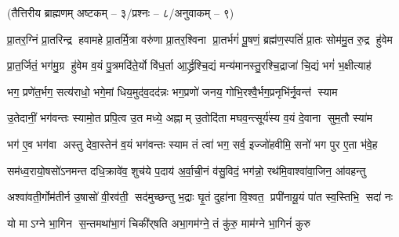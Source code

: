 

\centerline{\normalsize(तैत्तिरीय ब्राह्मणम् अष्टकम् – ३/प्रश्नः – ८/अनुवाकम् – ९)}


\twolineshloka
{प्रा॒तर॒ग्निं प्रा॒तरिन्द्र हवामहे प्रा॒तर्मि॒त्रा वरु॑णा प्रा॒तर॒श्विना}
{प्रा॒तर्भगं॑ पू॒षणं॒ ब्रह्म॑ण॒स्पतिं॑ प्रा॒तः सोम॑मु॒त रु॒द्र हु॑वेम}

\twolineshloka
{प्रा॒त॒र्जितं॒ भग॑मु॒ग्र हु॑वेम व॒यं पु॒त्रमदि॑ते॒र्यो वि॑ध॒र्ता}
{आ॒र्द्ध्रश्चि॒द्यं मन्य॑मानस्तु॒रश्चि॒द्राजा॑ चि॒द्यं भगं॑ भ॒क्षीत्याह॑}

\twolineshloka
{भग॒ प्रणे॑त॒र्भग॒ सत्य॑राधो॒ भगे॒मां धिय॒मुद॑व॒दद॑न्नः}
{भग॒प्रणो॑ जनय॒ गोभि॒रश्वै॒र्भग॒प्रनृभि॑र्नृ॒वन्त॑ स्याम}

\twolineshloka
{उ॒तेदानीं॒ भग॑वन्तः स्यामो॒त प्रपि॒त्व उ॒त मध्ये॒ अह्नाम्}
{उ॒तोदि॑ता मघव॒न्त्सूर्य॑स्य व॒यं दे॒वाना सुम॒तौ स्या॑म}

\twolineshloka
{भग॑ ए॒व भग॑वा अस्तु देवा॒स्तेन॑ व॒यं भग॑वन्तः स्याम}
{तं त्वा॑ भग॒ सर्व॒ इज्जो॑हवीमि॒ सनो॑ भग पुर ए॒ता भ॑वे॒ह}

\twolineshloka
{सम॑ध्व॒रायो॒षसो॑ऽनमन्त दधि॒क्रावे॑व॒ शुच॑ये प॒दाय॑}
{अ॒र्वा॒ची॒नं व॑सु॒विदं॒ भग॑न्नो॒ रथ॑मि॒वाश्वा॑वा॒जिन॒ आ॑वहन्तु}

\twolineshloka
{अश्वा॑वती॒र्गोम॑तीर्न उ॒षासो॑ वी॒रव॑ती॒ सद॑मुच्छन्तु भ॒द्राः}
{घृ॒तं दुहा॑ना वि॒श्वत॒ प्रपी॑नायू॒यं पा॑त स्व॒स्तिभि॒ सदा॑ नः}

\twolineshloka
{यो माऽग्ने भा॒गिन स॒न्तमथा॑भा॒गं चिकी॑र्‌षति}
{अभा॒गम॑ग्ने॒ तं कु॑रु॒ माम॑ग्ने भा॒गिनं॑ कुरु}

